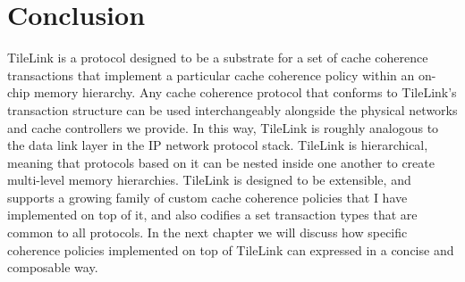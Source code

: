 \section{Conclusion}

TileLink is a protocol designed to be a substrate for a set of cache coherence transactions
that implement a particular cache coherence policy within an on-chip memory hierarchy.
Any cache coherence protocol that conforms to TileLink's transaction structure can be used interchangeably alongside the physical networks and cache controllers we provide.
In this way, TileLink is roughly analogous to the data link layer in the IP network protocol stack.
TileLink is hierarchical, meaning that protocols based on it can be nested inside one another to create multi-level memory hierarchies.
TileLink is designed to be extensible, and supports a growing family of custom cache coherence policies that I have implemented on top of it,
and also codifies a set transaction types that are common to all protocols.
In the next chapter we will discuss how specific coherence policies implemented on top of TileLink can expressed in a concise and composable way.

